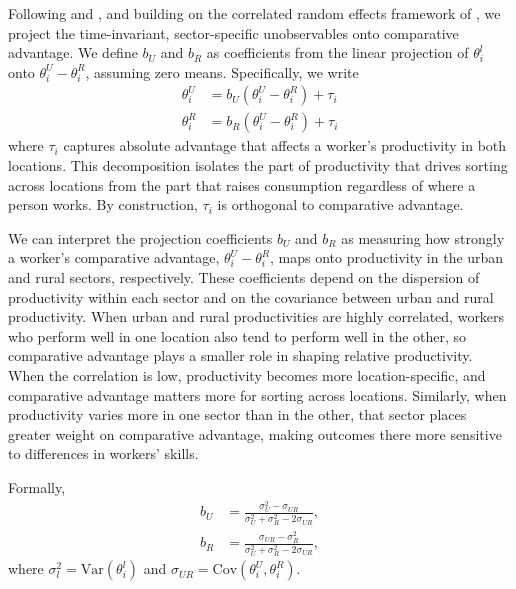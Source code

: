 Following \cite{lemieuxEstimatingEffectsUnions1998} and \cite{suriSelectionComparativeAdvantage2011}, and building on the correlated random effects framework of \citet{chamberlain1984panel}, we project the time-invariant, sector-specific unobservables onto comparative advantage.
We define $b_U$ and $b_R$ as coefficients from the linear projection of $\theta^{l}_{i}$ onto $\theta^{U}_{i} - \theta^{R}_{i}$, assuming zero means.  
Specifically, we write
\begin{align}
    \theta_i^U&=b_U(\theta_i^U-\theta_i^R)+\tau_i\\
    \theta_i^R&=b_R(\theta_i^U-\theta_i^R)+\tau_i
\end{align}
\noindent where $\tau_{i}$ captures absolute advantage that affects a worker's productivity in both locations.
This decomposition isolates the part of productivity that drives sorting across locations from the part that raises consumption regardless of where a person works.
By construction, $\tau_{i}$ is orthogonal to comparative advantage.

We can interpret the projection coefficients $b_{U}$ and $b_{R}$ as measuring how strongly a worker's comparative advantage, $\theta_{i}^U-\theta_{i}^R$, maps onto productivity in the urban and rural sectors, respectively.
These coefficients depend on the dispersion of productivity within each sector and on the covariance between urban and rural productivity.
When urban and rural productivities are highly correlated, workers who perform well in one location also tend to perform well in the other, so comparative advantage plays a smaller role in shaping relative productivity.
When the correlation is low, productivity becomes more location-specific, and comparative advantage matters more for sorting across locations.
Similarly, when productivity varies more in one sector than in the other, that sector places greater weight on comparative advantage, making outcomes there more sensitive to differences in workers' skills.

Formally, 
\begin{align}
b_U &= \frac{\sigma_U^2-\sigma_{UR}}{\sigma_U^2+\sigma_R^2-2\sigma_{UR}}, \\
b_R &= \frac{\sigma_{UR}-\sigma_R^2}{\sigma_U^2+\sigma_R^2-2\sigma_{UR}},
\end{align}
where $\sigma_l^2=\text{Var}(\theta_i^l)$ and $\sigma_{UR}=\text{Cov}(\theta_i^U,\theta_i^R)$.

